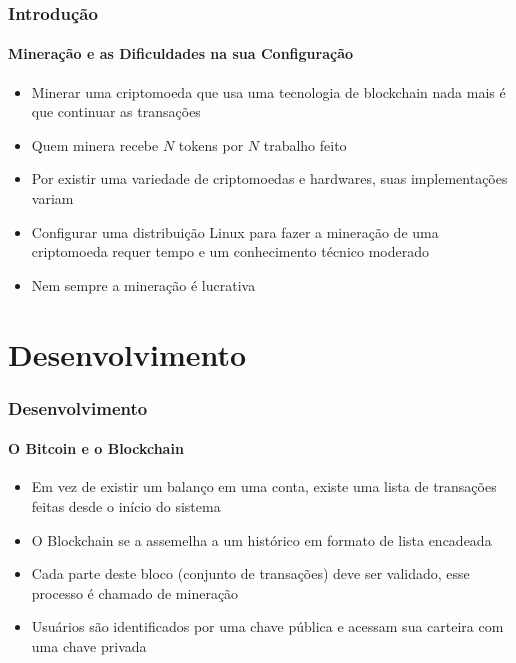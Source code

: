 \documentclass[aspectratio=169]{beamer}
\begin{document}
\begin{frame}
    \frametitle{Introdução}
    \framesubtitle{Mineração e as Dificuldades na sua Configuração}
    
    \begin{itemize}
        \item Minerar uma criptomoeda que usa uma tecnologia de blockchain
            nada mais é que continuar as transações\pause

        \item Quem minera recebe $N$ tokens por $N$ trabalho
            feito\pause

        \item Por existir uma variedade de criptomoedas e hardwares,
            suas implementações variam\pause

        \item Configurar uma distribuição Linux para fazer a mineração
            de uma criptomoeda requer tempo e um conhecimento técnico
            moderado\pause
        
        \item Nem sempre a mineração é lucrativa
    \end{itemize}
\end{frame}

\section[Desenvolvi\ldots]{Desenvolvimento}

\begin{frame}
    \frametitle{Desenvolvimento}
    \framesubtitle{O Bitcoin e o Blockchain}
    
    \begin{itemize}
        \item Em vez de existir um balanço em uma conta, existe uma lista de
            transações feitas desde o início do sistema
            \cite{Weber2012}\pause

        \item O Blockchain se a assemelha a um histórico em formato de
            lista encadeada\pause

        \item Cada parte deste bloco (conjunto de transações) deve ser
            validado, esse processo é chamado de mineração
            \cite{LChicarino}\pause

        \item Usuários são identificados por uma chave pública e
            acessam sua carteira com uma chave privada
        
    \end{itemize}
\end{frame}
\end{document}

